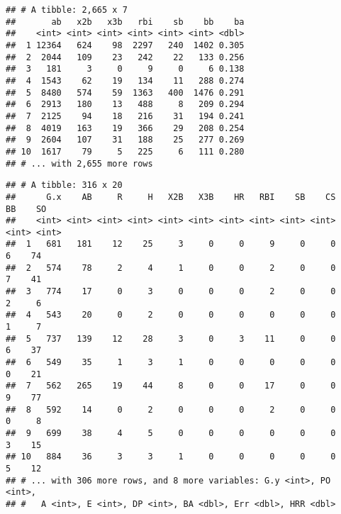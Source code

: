 \documentclass[]{book}
\newenvironment{Shaded}{\begin{snugshade}}{\end{snugshade}}
\newcommand{\KeywordTok}[1]{\textcolor[rgb]{0.13,0.29,0.53}{\textbf{#1}}}
\newcommand{\DecValTok}[1]{\textcolor[rgb]{0.00,0.00,0.81}{#1}}
\newcommand{\StringTok}[1]{\textcolor[rgb]{0.31,0.60,0.02}{#1}}
\newcommand{\CommentTok}[1]{\textcolor[rgb]{0.56,0.35,0.01}{\textit{#1}}}
\newcommand{\OperatorTok}[1]{\textcolor[rgb]{0.81,0.36,0.00}{\textbf{#1}}}
\newcommand{\NormalTok}[1]{#1}
\begin{document}
\begin{Shaded}
\end{Shaded}

\begin{verbatim}
## # A tibble: 2,665 x 7
##       ab   x2b   x3b   rbi    sb    bb    ba
##    <int> <int> <int> <int> <int> <int> <dbl>
##  1 12364   624    98  2297   240  1402 0.305
##  2  2044   109    23   242    22   133 0.256
##  3   181     3     0     9     0     6 0.138
##  4  1543    62    19   134    11   288 0.274
##  5  8480   574    59  1363   400  1476 0.291
##  6  2913   180    13   488     8   209 0.294
##  7  2125    94    18   216    31   194 0.241
##  8  4019   163    19   366    29   208 0.254
##  9  2604   107    31   188    25   277 0.269
## 10  1617    79     5   225     6   111 0.280
## # ... with 2,655 more rows
\end{verbatim}

\begin{Shaded}
\end{Shaded}

\begin{verbatim}
## # A tibble: 316 x 20
##      G.x    AB     R     H   X2B   X3B    HR   RBI    SB    CS    BB    SO
##    <int> <int> <int> <int> <int> <int> <int> <int> <int> <int> <int> <int>
##  1   681   181    12    25     3     0     0     9     0     0     6    74
##  2   574    78     2     4     1     0     0     2     0     0     7    41
##  3   774    17     0     3     0     0     0     2     0     0     2     6
##  4   543    20     0     2     0     0     0     0     0     0     1     7
##  5   737   139    12    28     3     0     3    11     0     0     6    37
##  6   549    35     1     3     1     0     0     0     0     0     0    21
##  7   562   265    19    44     8     0     0    17     0     0     9    77
##  8   592    14     0     2     0     0     0     2     0     0     0     8
##  9   699    38     4     5     0     0     0     0     0     0     3    15
## 10   884    36     3     3     1     0     0     0     0     0     5    12
## # ... with 306 more rows, and 8 more variables: G.y <int>, PO <int>,
## #   A <int>, E <int>, DP <int>, BA <dbl>, Err <dbl>, HRR <dbl>
\end{verbatim}
\end{document}

